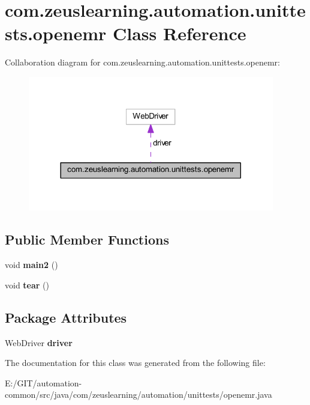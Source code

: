 \hypertarget{classcom_1_1zeuslearning_1_1automation_1_1unittests_1_1openemr}{}\section{com.\+zeuslearning.\+automation.\+unittests.\+openemr Class Reference}
\label{classcom_1_1zeuslearning_1_1automation_1_1unittests_1_1openemr}


Collaboration diagram for com.\+zeuslearning.\+automation.\+unittests.\+openemr\+:
\nopagebreak
\begin{figure}[H]
\begin{center}
\leavevmode
\includegraphics[width=305pt]{d8/de8/classcom_1_1zeuslearning_1_1automation_1_1unittests_1_1openemr__coll__graph}
\end{center}
\end{figure}
\subsection*{Public Member Functions}
\begin{DoxyCompactItemize}
\item 
\hypertarget{classcom_1_1zeuslearning_1_1automation_1_1unittests_1_1openemr_ab4c4a517d9deafd77fc9aba3b2145ea7}{}\label{classcom_1_1zeuslearning_1_1automation_1_1unittests_1_1openemr_ab4c4a517d9deafd77fc9aba3b2145ea7} 
void {\bfseries main2} ()
\item 
\hypertarget{classcom_1_1zeuslearning_1_1automation_1_1unittests_1_1openemr_ac3a356bc4902e4e1b91c7cdabf0f7cca}{}\label{classcom_1_1zeuslearning_1_1automation_1_1unittests_1_1openemr_ac3a356bc4902e4e1b91c7cdabf0f7cca} 
void {\bfseries tear} ()
\end{DoxyCompactItemize}
\subsection*{Package Attributes}
\begin{DoxyCompactItemize}
\item 
\hypertarget{classcom_1_1zeuslearning_1_1automation_1_1unittests_1_1openemr_a644829bd755bef5b8eb0b87a8e2bde8e}{}\label{classcom_1_1zeuslearning_1_1automation_1_1unittests_1_1openemr_a644829bd755bef5b8eb0b87a8e2bde8e} 
Web\+Driver {\bfseries driver}
\end{DoxyCompactItemize}


The documentation for this class was generated from the following file\+:\begin{DoxyCompactItemize}
\item 
E\+:/\+G\+I\+T/automation-\/common/src/java/com/zeuslearning/automation/unittests/openemr.\+java\end{DoxyCompactItemize}
